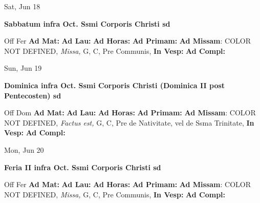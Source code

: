 \documentclass[10pt]{memoir}
\begin{document}
\begin{center}
\begin{minipage}{3.5in}
\vspace{2em}
\begin{center}Sat, Jun 18
\end{center}
\textbf{ \large Sabbatum infra Oct. Ssmi Corporis Christi
\textnormal{\normalsize sd}}

\begin{justify}Off Fer
\textbf{Ad Mat: }
\textbf{Ad Lau: }
\textbf{Ad Horas: }
\textbf{Ad Primam: }\textbf{Ad Missam}: COLOR NOT DEFINED, \textit{Missa,} G, C, Pre Communis, 
\textbf{In Vesp: }
\textbf{Ad Compl: }
\end{justify}
\end{minipage}
\end{center}

\begin{center}
\begin{minipage}{3.5in}
\vspace{2em}
\begin{center}Sun, Jun 19
\end{center}
\textbf{ \large Dominica infra Oct. Ssmi Corporis Christi (Dominica II post Pentecosten)
\textnormal{\normalsize sd}}

\begin{justify}Off Dom
\textbf{Ad Mat: }
\textbf{Ad Lau: }
\textbf{Ad Horas: }
\textbf{Ad Primam: }\textbf{Ad Missam}: COLOR NOT DEFINED, \textit{Factus est,} G, C, Pre de Nativitate, vel de Ssma Trinitate, 
\textbf{In Vesp: }
\textbf{Ad Compl: }
\end{justify}
\end{minipage}
\end{center}

\begin{center}
\begin{minipage}{3.5in}
\vspace{2em}
\begin{center}Mon, Jun 20
\end{center}
\textbf{ \large Feria II infra Oct. Ssmi Corporis Christi
\textnormal{\normalsize sd}}

\begin{justify}Off Fer
\textbf{Ad Mat: }
\textbf{Ad Lau: }
\textbf{Ad Horas: }
\textbf{Ad Primam: }\textbf{Ad Missam}: COLOR NOT DEFINED, \textit{Missa,} G, C, Pre Communis, 
\textbf{In Vesp: }
\textbf{Ad Compl: }
\end{justify}
\end{minipage}
\end{center}
\end{document}
